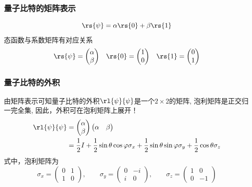 \begin{frame} 
    \frametitle{量子比特的矩阵表示}
    \[\rs{\psi} =\alpha\rs{0}+\beta\rs{1} \] 
    态函数与系数矩阵有对应关系\\
   \[
    \begin{matrix} 
    \rs{\psi} =\begin{pmatrix}
            \alpha\\
            \beta
    \end{pmatrix}
    &    
    \rs{0} 
    =\begin{pmatrix}
        1\\
        0
    \end{pmatrix}
    &
    \rs{1} 
    =\begin{pmatrix}
        0\\
        1
    \end{pmatrix}
    \end{matrix}    
    \]
\end{frame}

\begin{frame} 
    \frametitle{量子比特的外积}
    由矩阵表示可知量子比特的外积$\rl{\psi}{\psi}$是一个$2\times 2$的矩阵,
    泡利矩阵是正交归一完全集,
    因此，外积可在泡利矩阵上展开！
    \[\begin{aligned}
    \rl{\psi}{\psi} 
    &=
    \begin{pmatrix}
        \alpha\\
        \beta
    \end{pmatrix}
    \begin{pmatrix}
        \alpha & \beta
    \end{pmatrix}
 \\
    &= \frac{1}{2}I +\frac{1}{2}\sin\theta\cos\varphi\sigma_x +\frac{1}{2}\sin\theta\sin\varphi\sigma_y+ \frac{1}{2}\cos\theta\sigma_z 
\end{aligned}\]
式中，泡利矩阵为
\[
\sigma_x =
\begin{pmatrix}
    0 & 1 \\
    1 & 0 
\end{pmatrix}, \qquad
\sigma_y =
\begin{pmatrix}
    0 & -i \\
    i & 0 
\end{pmatrix}, \qquad
\sigma_z =
\begin{pmatrix}
    1 & 0 \\
    0 & -1 
\end{pmatrix}
\]
\end{frame}

